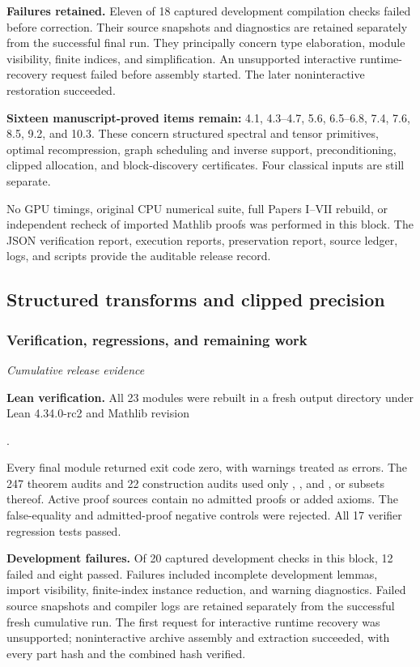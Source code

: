 \textbf{Failures retained.} Eleven of 18 captured development compilation checks failed before correction. Their source snapshots and diagnostics are retained separately from the successful final run. They principally concern type elaboration, module visibility, finite indices, and simplification. An unsupported interactive runtime-recovery request failed before assembly started. The later noninteractive restoration succeeded.

\textbf{Sixteen manuscript-proved items remain:} 4.1, 4.3--4.7, 5.6, 6.5--6.8, 7.4, 7.6, 8.5, 9.2, and 10.3. These concern structured spectral and tensor primitives, optimal recompression, graph scheduling and inverse support, preconditioning, clipped allocation, and block-discovery certificates. Four classical inputs are still separate.

No GPU timings, original CPU numerical suite, full Papers I--VII rebuild, or independent recheck of imported Mathlib proofs was performed in this block. The JSON verification report, execution reports, preservation report, source ledger, logs, and scripts provide the auditable release record.


\subsection{Structured transforms and clipped precision}\label{sec:history-4}


\subsubsection*{Verification, regressions, and remaining work}\label{history:supp4:subsection:007}\textit{Cumulative release evidence}\par
\textbf{Lean verification.} All 23 modules were rebuilt in a fresh output directory under Lean 4.34.0-rc2 and Mathlib revision
\begin{center}.\end{center}
Every final module returned exit code zero, with warnings treated as errors. The 247 theorem audits and 22 construction audits used only , , and , or subsets thereof. Active proof sources contain no admitted proofs or added axioms. The false-equality and admitted-proof negative controls were rejected. All 17 verifier regression tests passed.

\textbf{Development failures.} Of 20 captured development checks in this block, 12 failed and eight passed. Failures included incomplete development lemmas, import visibility, finite-index instance reduction, and warning diagnostics. Failed source snapshots and compiler logs are retained separately from the successful fresh cumulative run. The first request for interactive runtime recovery was unsupported; noninteractive archive assembly and extraction succeeded, with every part hash and the combined hash verified.

